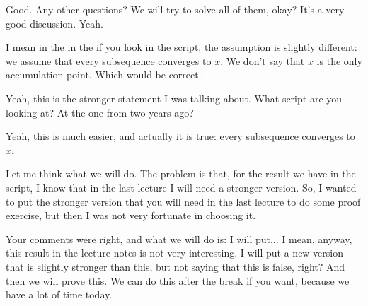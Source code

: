 \begin{hidden}
\end{hidden}

\begin{speech}[00:40:45 - 00:41:05]
Good. Any other questions? We will try to solve all of them, okay? It's a very good discussion. Yeah.
\end{speech}

\begin{student}
I mean in the in the if you look in the script, the assumption is slightly different: we assume that every subsequence converges to $x$. We don't say that $x$ is the only accumulation point. Which would be correct.
\end{student}

\begin{speech}[00:41:06 - 00:42:38]
Yeah, this is the stronger statement I was talking about. What script are you looking at? At the one from two years ago?


Yeah, this is much easier, and actually it is true: every subsequence converges to $x$.

Let me think what we will do. The problem is that, for the result we have in the script, I know that in the last lecture I will need a stronger version. So, I wanted to put the stronger version that you will need in the last lecture to do some proof exercise, but then I was not very fortunate in choosing it.

Your comments were right, and what we will do is: I will put... I mean, anyway, this result in the lecture notes is not very interesting. I will put a new version that is slightly stronger than this, but not saying that this is false, right? And then we will prove this. We can do this after the break if you want, because we have a lot of time today.
\end{speech}

\begin{hidden}
\end{hidden}

